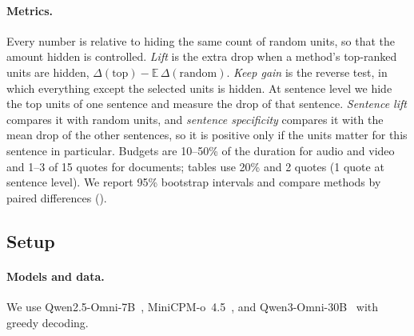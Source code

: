 \paragraph{Metrics.}
Every number is relative to hiding the same count of random units, so that the amount hidden is controlled.
\emph{Lift} is the extra drop when a method's top-ranked units are hidden, $\Delta(\text{top})-\mathbb{E}\,\Delta(\text{random})$.
\emph{Keep gain} is the reverse test, in which everything except the selected units is hidden.
At sentence level we hide the top units of one sentence and measure the drop of that sentence. \emph{Sentence lift} compares it with random units, and \emph{sentence specificity} compares it with the mean drop of the other sentences, so it is positive only if the units matter for this sentence in particular.
Budgets are 10--50\% of the duration for audio and video and 1--3 of 15 quotes for documents; tables use 20\% and 2 quotes (1 quote at sentence level).
We report 95\% bootstrap intervals and compare methods by paired differences ().

\subsection{Setup}



\begin{table}[t]
\centering
\scriptsize
\setlength{\tabcolsep}{4.2pt}

\caption{\textbf{Causal faithfulness and cost.}
Fwd: extra forward passes per question.
Lift: extra drop in the response's log-probability when a method's top units are hidden, over hiding the same number of random units; S-lift and S-spec: sentence lift and specificity.
\textbf{Bold} / \underline{underline}: largest / second largest value of a column.
$^\ast$Defined for text in the original work; run on audio, video, and images with OmniTrace's units and placeholders.
$^\P$Head weights fitted on ablation data; no pass added at test time.}
\label{tab:baselines}
\skiptableend
\end{table}

\paragraph{Models and data.}
We use Qwen2.5-Omni-7B~\cite{xu2025qwen2}, MiniCPM-o~4.5~\cite{cui2026minicpm}, and Qwen3-Omni-30B~\cite{Xu2025Qwen3OmniTR} with greedy decoding. 

